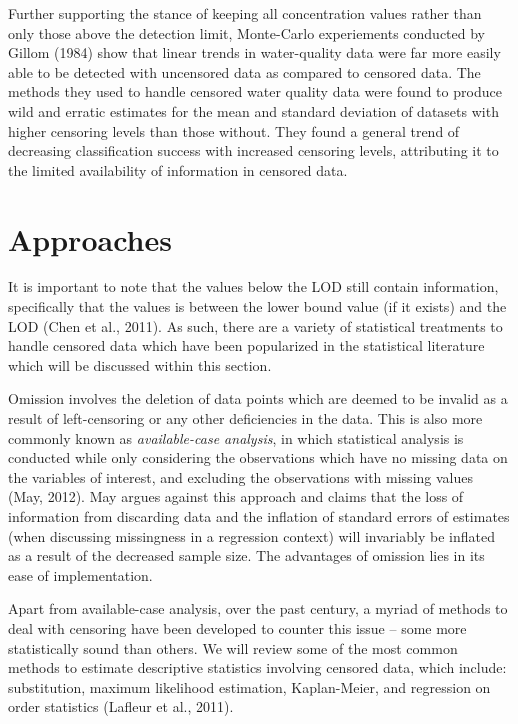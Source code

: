 \documentclass[12pt, twoside]{amherstthesis}
\begin{document}
Further supporting the stance of keeping all concentration values rather than only those above the detection limit, Monte-Carlo experiements conducted by Gillom (1984) show that linear trends in water-quality data were far more easily able to be detected with uncensored data as compared to censored data. The methods they used to handle censored water quality data were found to produce wild and erratic estimates for the mean and standard deviation of datasets with higher censoring levels than those without. They found a general trend of decreasing classification success with increased censoring levels, attributing it to the limited availability of information in censored data.

\hypertarget{Approaches}{%
\section{Approaches}\label{Approaches}}

It is important to note that the values below the LOD still contain information, specifically that the values is between the lower bound value (if it exists) and the LOD (Chen et al., 2011). As such, there are a variety of statistical treatments to handle censored data which have been popularized in the statistical literature which will be discussed within this section.

Omission involves the deletion of data points which are deemed to be invalid as a result of left-censoring or any other deficiencies in the data. This is also more commonly known as \emph{available-case analysis}, in which statistical analysis is conducted while only considering the observations which have no missing data on the variables of interest, and excluding the observations with missing values (May, 2012). May argues against this approach and claims that the loss of information from discarding data and the inflation of standard errors of estimates (when discussing missingness in a regression context) will invariably be inflated as a result of the decreased sample size. The advantages of omission lies in its ease of implementation.

Apart from available-case analysis, over the past century, a myriad of methods to deal with censoring have been developed to counter this issue -- some more statistically sound than others. We will review some of the most common methods to estimate descriptive statistics involving censored data, which include: substitution, maximum likelihood estimation, Kaplan-Meier, and regression on order statistics (Lafleur et al., 2011).
\end{document}
